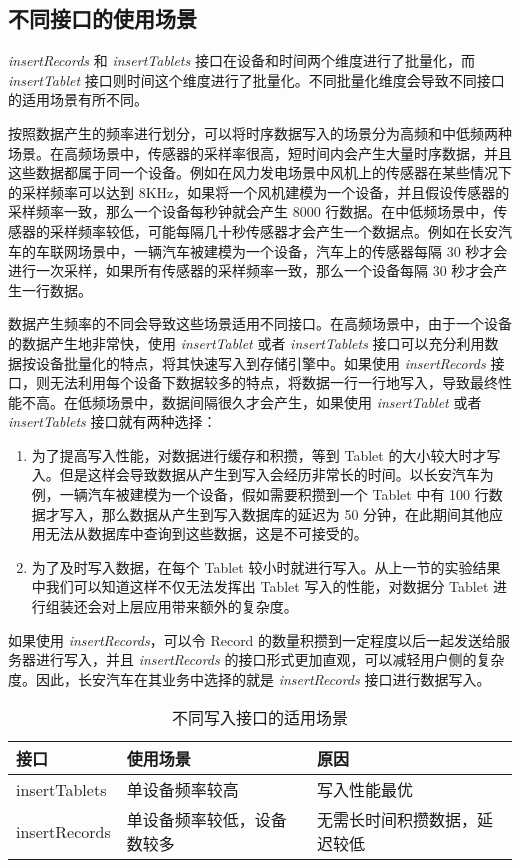 \subsection{不同接口的使用场景}
\emph{insertRecords} 和 \emph{insertTablets} 接口在设备和时间两个维度进行了批量化，而 \emph{insertTablet} 接口则时间这个维度进行了批量化。不同批量化维度会导致不同接口的适用场景有所不同。

按照数据产生的频率进行划分，可以将时序数据写入的场景分为高频和中低频两种场景。在高频场景中，传感器的采样率很高，短时间内会产生大量时序数据，并且这些数据都属于同一个设备。例如在风力发电场景中风机上的传感器在某些情况下的采样频率可以达到 8KHz\cite{李天安2020apache}，如果将一个风机建模为一个设备，并且假设传感器的采样频率一致，那么一个设备每秒钟就会产生 8000 行数据。在中低频场景中，传感器的采样频率较低，可能每隔几十秒传感器才会产生一个数据点。例如在长安汽车的车联网场景中，一辆汽车被建模为一个设备，汽车上的传感器每隔 30 秒才会进行一次采样，如果所有传感器的采样频率一致，那么一个设备每隔 30 秒才会产生一行数据。

数据产生频率的不同会导致这些场景适用不同接口。在高频场景中，由于一个设备的数据产生地非常快，使用 \emph{insertTablet} 或者 \emph{insertTablets} 接口可以充分利用数据按设备批量化的特点，将其快速写入到存储引擎中。如果使用 \emph{insertRecords} 接口，则无法利用每个设备下数据较多的特点，将数据一行一行地写入，导致最终性能不高。在低频场景中，数据间隔很久才会产生，如果使用 \emph{insertTablet} 或者 \emph{insertTablets} 接口就有两种选择：
\begin{enumerate}
  \item 为了提高写入性能，对数据进行缓存和积攒，等到 Tablet 的大小较大时才写入。但是这样会导致数据从产生到写入会经历非常长的时间。以长安汽车为例，一辆汽车被建模为一个设备，假如需要积攒到一个 Tablet 中有 100 行数据才写入，那么数据从产生到写入数据库的延迟为 50 分钟，在此期间其他应用无法从数据库中查询到这些数据，这是不可接受的。
  \item 为了及时写入数据，在每个 Tablet 较小时就进行写入。从上一节的实验结果中我们可以知道这样不仅无法发挥出 Tablet 写入的性能，对数据分 Tablet 进行组装还会对上层应用带来额外的复杂度。
\end{enumerate}
如果使用 \emph{insertRecords}，可以令 Record 的数量积攒到一定程度以后一起发送给服务器进行写入，并且 \emph{insertRecords} 的接口形式更加直观，可以减轻用户侧的复杂度。因此，长安汽车在其业务中选择的就是 \emph{insertRecords} 接口进行数据写入。

\begin{table}
  \centering
  \caption{不同写入接口的适用场景}
  \begin{tabular}{lll}
    \toprule
    接口 & 使用场景 & 原因 \\
    \midrule
    insertTablets & 单设备频率较高 & 写入性能最优\\
     insertRecords &  单设备频率较低，设备数较多 & 无需长时间积攒数据，延迟较低 \\
    \bottomrule
  \end{tabular}
  \label{tabular:insert-interfaces-scene}
\end{table}


